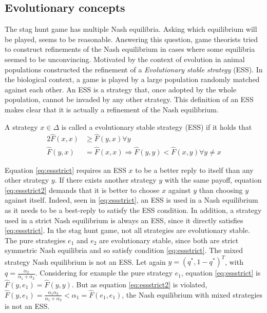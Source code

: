 \documentclass[11pt]{article}
\begin{document}
\subsection{Evolutionary concepts}
The stag hunt game has multiple Nash equilibria. Asking which equilibrium
will be played, seems to be reasonable. Answering this question, game 
theorists tried to construct refinements of the Nash equilibrium in cases where 
some equilibria seemed to be unconvincing. Motivated by the context of 
evolution in animal populations \textcite{smith_lhe_1973} constructed the 
refinement of a \textit{Evolutionary stable strategy} (ESS).  
In the biological context, a game is played 
by a large population randomly matched against each other.
An ESS is a strategy that, once adopted by the whole population, cannot
be invaded by any other strategy. 
This definition of an ESS makes clear that it is actually a refinement of the 
Nash equilibrium.
\begin{mydef}
        A strategy $x \in \Delta$ is called a evolutionary stable strategy 
        (ESS) if it holds that
        \begin{alignat}{2}
                \label{eq:essstrict}
                \hat{F}(x,x) &\geq \hat{F}(y,x) \forall y \\ 
                \hat{F}(y,x) &= \hat{F}(x,x) \Rightarrow  
                \hat{F}(y,y) < \hat{F}(x,y) \forall y \neq x \label{eq:essstrict2}
        \end{alignat}
\end{mydef}
Equation \eqref{eq:essstrict}
requires an ESS $x$ to be a better reply to itself than any other strategy $y$.
If there exists another strategy $y$ with the same payoff, equation 
\eqref{eq:essstrict2} demands that it is better to choose $x$ against $y$ than
choosing $y$ against itself.
Indeed, seen in \eqref{eq:essstrict}, an ESS is used in a Nash equilibrium as 
it needs to be a best-reply to satisfy the ESS condition. In addition, 
a strategy used in a strict Nash equilibrium is always an ESS, 
since it directly satisfies 
\eqref{eq:essstrict}. 
In the stag hunt game, not all strategies are evolutionary stable.
The pure strategies $e_1$ and $e_2$ are evolutionary stable,
since both are strict symmetric Nash equilibria and so 
satisfy condition \eqref{eq:essstrict}. 
The mixed strategy Nash equilibrium is not an ESS.  
Let again $y=(q^*,1-q^*)^T$, with $q=\frac{\alpha_2}{\alpha_1+\alpha_2}$.
Considering for example the pure strategy $e_1$, 
equation \ref{eq:essstrict} is $\hat{F}(y,e_1)= \hat{F}(y,y)$.  
But as equation \eqref{eq:essstrict2} is violated,
$\hat{F}(y,e_1) = \frac{\alpha_1 \alpha_2}{\alpha_1+\alpha_2}
< \alpha_1 = \hat{F}(e_1,e_1)$, the Nash equilibrium with mixed strategies 
is not an ESS.
\end{document}

